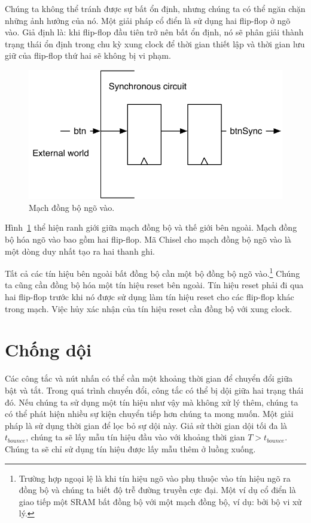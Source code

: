 \documentclass[%
    10pt,
    headinclude, footexclude,
    openright, %
    notitlepage,
    cleardoubleempty,
    headsepline,
    pointlessnumbers,
    bibtotoc, idxtotoc,
    ]{scrbook}
\newcommand{\scale}{0.7}
\begin{document}
Chúng ta không thể tránh được sự bất ổn định, nhưng chúng ta có thể ngăn chặn những ảnh hưởng của nó. Một giải pháp cổ điển là sử dụng hai flip-flop ở ngõ vào. Giả định là: khi flip-flop đầu tiên trở nên bất ổn định, nó sẽ phân giải thành trạng thái ổn định trong chu kỳ xung clock để thời gian thiết lập và thời gian lưu giữ của flip-flop thứ hai sẽ không bị vi phạm. 


\begin{figure}
  \centering
  \includegraphics[scale=\scale]{figures/synchronizer}
  \caption{Mạch đồng bộ ngõ vào.}
  \label{fig:synchronizer}
\end{figure}

Hình~\ref{fig:synchronizer} thể hiện ranh giới giữa mạch đồng bộ và thế giới bên ngoài. Mạch đồng bộ hóa ngõ vào bao gồm hai flip-flop. Mã Chisel cho mạch đồng bộ ngõ vào là một dòng duy nhất tạo ra hai thanh ghi.


Tất cả các tín hiệu bên ngoài bất đồng bộ cần một bộ đồng bộ ngõ vào.\footnote{Trường hợp ngoại lệ là khi tín hiệu ngõ vào phụ thuộc vào tín hiệu ngõ ra đồng bộ và chúng ta biết độ trễ đường truyền cực đại. Một ví dụ cổ điển là giao tiếp một SRAM bất đồng bộ với một mạch đồng bộ, ví dụ: bởi bộ vi xử lý.} Chúng ta cũng cần đồng bộ hóa một tín hiệu reset bên ngoài. Tín hiệu reset phải đi qua hai flip-flop trước khi nó được sử dụng làm tín hiệu reset cho các flip-flop khác trong mạch. Việc hủy xác nhận của tín hiệu reset cần đồng bộ với xung clock. 

\section{Chống dội}

Các công tắc và nút nhấn có thể cần một khoảng thời gian để chuyển đổi giữa bật và tắt. Trong quá trình chuyển đổi, công tắc có thể bị dội giữa hai trạng thái đó. Nếu chúng ta sử dụng một tín hiệu như vậy mà không xử lý thêm, chúng ta có thể phát hiện nhiều sự kiện chuyển tiếp hơn chúng ta mong muốn. Một giải pháp là sử dụng thời gian để lọc bỏ sự dội này. Giả sử thời gian dội tối đa là $t_{bounce}$, chúng ta sẽ lấy mẫu tín hiệu đầu vào với khoảng thời gian $T>t_{bounce}$. Chúng ta sẽ chỉ sử dụng tín hiệu được lấy mẫu thêm ở luồng xuống.
\end{document}
